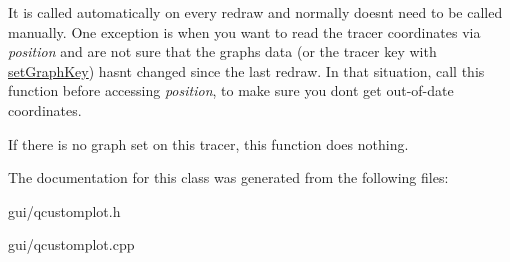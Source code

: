 It is called automatically on every redraw and normally doesn\textquotesingle{}t need to be called manually. One exception is when you want to read the tracer coordinates via {\itshape position} and are not sure that the graph\textquotesingle{}s data (or the tracer key with \hyperlink{classQCPItemTracer_a6840143b42f3b685cedf7c6d83a704c8}{set\+Graph\+Key}) hasn\textquotesingle{}t changed since the last redraw. In that situation, call this function before accessing {\itshape position}, to make sure you don\textquotesingle{}t get out-\/of-\/date coordinates.

If there is no graph set on this tracer, this function does nothing. 

The documentation for this class was generated from the following files\+:\begin{DoxyCompactItemize}
\item 
gui/qcustomplot.\+h\item 
gui/qcustomplot.\+cpp\end{DoxyCompactItemize}
